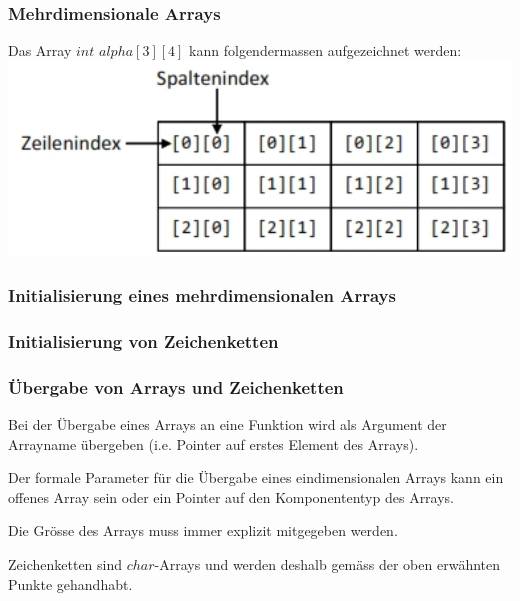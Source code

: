 		\hspace*{0.5cm}
		\begin{minipage}[t]{9 cm}	
			\subsubsection{Mehrdimensionale Arrays }
				Das Array $int$ $alpha[3][4]$ kann folgendermassen aufgezeichnet werden: \\
				\includegraphics[width=1\textwidth]{pics/array_mehrdimensional.jpg}
			
			\subsubsection{Initialisierung eines mehrdimensionalen Arrays }
				
		\end{minipage}

		\subsubsection{Initialisierung von Zeichenketten }
			
			
		\subsubsection{Übergabe von Arrays und Zeichenketten }
			\begin{compactitem}
				\item Bei der Übergabe eines Arrays an eine Funktion wird als Argument der Arrayname übergeben (i.e. Pointer auf erstes Element des Arrays).
				\item Der formale Parameter für die Übergabe eines eindimensionalen Arrays kann ein offenes Array sein oder ein Pointer auf den Komponententyp des Arrays.
				\item Die Grösse des Arrays muss immer explizit mitgegeben werden.
				\item Zeichenketten sind $char$-Arrays und werden deshalb gemäss der oben erwähnten Punkte gehandhabt.
			\end{compactitem}
			
			
